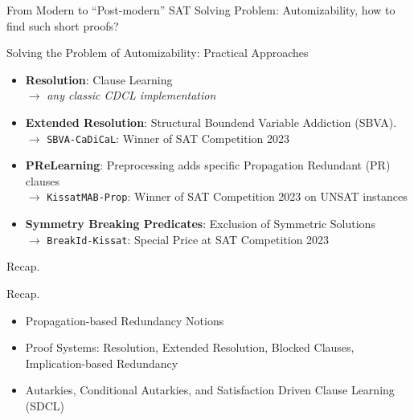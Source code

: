 \documentclass[t]{sdqbeamer}
\begin{document}
\begin{frame}{From Modern to ``Post-modern'' SAT Solving}
Problem: Automizability, how to find such short proofs?~\\[1ex]
\begin{block}{Solving the Problem of Automizability: Practical Approaches}
\begin{itemize}\setlength{\itemsep}{1em}
\item \textbf{Resolution}: Clause Learning\\[1ex]
$\bm\rightarrow$ \emph{any classic CDCL implementation}
\item \textbf{Extended Resolution}: Structural Boundend Variable Addiction (SBVA).\\[1ex]
$\bm\rightarrow$ \texttt{SBVA-CaDiCaL}: Winner of SAT Competition 2023
\item \textbf{PReLearning}: Preprocessing adds specific Propagation Redundant (PR) clauses\\[1ex]
$\bm\rightarrow$ \texttt{KissatMAB-Prop}: Winner of SAT Competition 2023 on UNSAT instances
\item \textbf{Symmetry Breaking Predicates}: Exclusion of Symmetric Solutions\\[1ex]
$\bm\rightarrow$ \texttt{BreakId-Kissat}: Special Price at SAT Competition 2023
\end{itemize}
\end{block}
\end{frame}


\begin{frame}{Recap.}
\begin{block}{Recap.}
\begin{itemize}\setlength{\itemsep}{1em}
    \item Propagation-based Redundancy Notions
    \item Proof Systems: Resolution, Extended Resolution, Blocked Clauses, Implication-based Redundancy
    \item Autarkies, Conditional Autarkies, and Satisfaction Driven Clause Learning (SDCL)
\end{itemize}
\end{block}
\end{frame}
\end{document}
